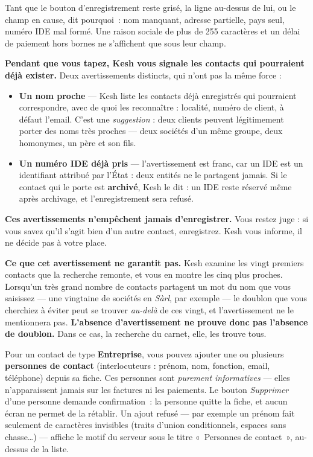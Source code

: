 \documentclass[a4paper,11pt,oneside]{article}
\begin{document}
Tant que le bouton d'enregistrement reste grisé, la ligne au-dessus de lui, ou le champ en cause, dit pourquoi~: nom manquant, adresse partielle, pays seul, numéro IDE mal formé. Une raison sociale de plus de 255 caractères et un délai de paiement hors bornes ne s'affichent que sous leur champ.

\begin{keshnote}
\textbf{Pendant que vous tapez, Kesh vous signale les contacts qui pourraient déjà
exister.} Deux avertissements distincts, qui n'ont pas la même force :

\begin{itemize}
    \item \textbf{Un nom proche} --- Kesh liste les contacts déjà enregistrés qui
    pourraient correspondre, avec de quoi les reconnaître : localité, numéro de
    client, à défaut l'email. C'est une \emph{suggestion} : deux clients peuvent
    légitimement porter des noms très proches --- deux sociétés d'un même groupe,
    deux homonymes, un père et son fils.
    \item \textbf{Un numéro IDE déjà pris} --- l'avertissement est franc, car un
    IDE est un identifiant attribué par l'État : deux entités ne le partagent
    jamais. Si le contact qui le porte est \textbf{archivé}, Kesh le dit : un IDE
    reste réservé même après archivage, et l'enregistrement sera refusé.
\end{itemize}

\textbf{Ces avertissements n'empêchent jamais d'enregistrer.} Vous restez juge :
si vous savez qu'il s'agit bien d'un autre contact, enregistrez. Kesh vous
informe, il ne décide pas à votre place.

\textbf{Ce que cet avertissement ne garantit pas.} Kesh examine les vingt
premiers contacts que la recherche remonte, et vous en montre les cinq plus
proches. Lorsqu'un très grand nombre de contacts partagent un mot du nom que
vous saisissez --- une vingtaine de sociétés en \emph{Sàrl}, par exemple ---
le doublon que vous cherchiez à éviter peut se trouver \emph{au-delà} de ces
vingt, et l'avertissement ne le mentionnera pas. \textbf{L'absence
d'avertissement ne prouve donc pas l'absence de doublon.} Dans ce cas, la
recherche du carnet, elle, les trouve tous.
\end{keshnote}

\begin{keshnote}
Pour un contact de type \textbf{Entreprise}, vous pouvez ajouter une ou plusieurs
\textbf{personnes de contact} (interlocuteurs : prénom, nom, fonction, email,
téléphone) depuis sa fiche. Ces personnes sont \emph{purement informatives} —
elles n'apparaissent jamais sur les factures ni les paiements. Le bouton
\emph{Supprimer} d'une personne demande confirmation~: la personne quitte la fiche,
et aucun écran ne permet de la rétablir. Un ajout refusé --- par exemple un prénom
fait seulement de caractères invisibles (traits d'union conditionnels, espaces sans chasse…) ---
affiche le motif du serveur sous le titre «~Personnes de contact~», au-dessus de la liste.
\end{keshnote}
\end{document}
